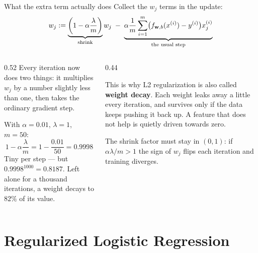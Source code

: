\documentclass[aspectratio=169,10pt]{beamer}
\begin{document}
\begin{frame}{What the extra term actually does}
  \footnotesize
  Collect the $w_j$ terms in the update:
  \[
    w_j := \underbrace{\left(1 - \alpha\frac{\lambda}{m}\right)}_{\text{shrink}} w_j
           \;-\; \underbrace{\alpha\frac{1}{m}\sum_{i=1}^{m}
             \bigl(f_{\mathbf{w},b}(x^{(i)})-y^{(i)}\bigr)x^{(i)}_{j}}_{\text{the usual step}}
  \]
  \begin{columns}[T,onlytextwidth]
    \begin{column}{0.52\textwidth}
      Every iteration now does two things: it multiplies $w_j$ by a number slightly less than
      one, then takes the ordinary gradient step.
      \par\vspace{1mm}
      With $\alpha=0.01$, $\lambda=1$, $m=50$:
      \[ 1 - \alpha\frac{\lambda}{m} = 1 - \frac{0.01}{50} = 0.9998 \]
      Tiny per step --- but $0.9998^{1000} = 0.8187$. Left alone for a thousand iterations, a
      weight decays to $82\%$ of its value.
    \end{column}
    \begin{column}{0.44\textwidth}
      \begin{keyidea}
        \footnotesize
        This is why L2 regularization is also called \textbf{weight decay}. Each weight leaks
        away a little every iteration, and survives only if the data keeps pushing it back
        up. A feature that does not help is quietly driven towards zero.
      \end{keyidea}
      \par\vspace{1mm}
      The shrink factor must stay in $(0,1)$: if $\alpha\lambda/m > 1$ the sign of $w_j$ flips
      each iteration and training diverges.
    \end{column}
  \end{columns}
\end{frame}

\section{Regularized Logistic Regression}
\end{document}
